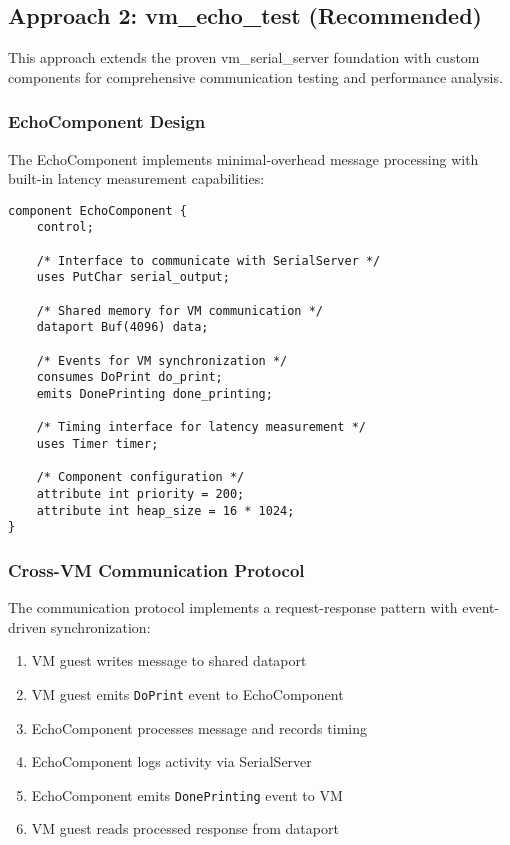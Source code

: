 \documentclass[12pt,a4paper]{article}
\begin{document}
\subsection{Approach 2: vm\_echo\_test (Recommended)}

This approach extends the proven vm\_serial\_server foundation with custom components for comprehensive communication testing and performance analysis.

\subsubsection{EchoComponent Design}

The EchoComponent implements minimal-overhead message processing with built-in latency measurement capabilities:

\begin{lstlisting}[style=camkes, caption=EchoComponent interface definition]
component EchoComponent {
    control;
    
    /* Interface to communicate with SerialServer */
    uses PutChar serial_output;
    
    /* Shared memory for VM communication */
    dataport Buf(4096) data;
    
    /* Events for VM synchronization */
    consumes DoPrint do_print;
    emits DonePrinting done_printing;
    
    /* Timing interface for latency measurement */
    uses Timer timer;
    
    /* Component configuration */
    attribute int priority = 200;
    attribute int heap_size = 16 * 1024;
}
\end{lstlisting}

\subsubsection{Cross-VM Communication Protocol}

The communication protocol implements a request-response pattern with event-driven synchronization:

\begin{enumerate}
\item VM guest writes message to shared dataport
\item VM guest emits \texttt{DoPrint} event to EchoComponent
\item EchoComponent processes message and records timing
\item EchoComponent logs activity via SerialServer
\item EchoComponent emits \texttt{DonePrinting} event to VM
\item VM guest reads processed response from dataport
\end{enumerate}
\end{document}
